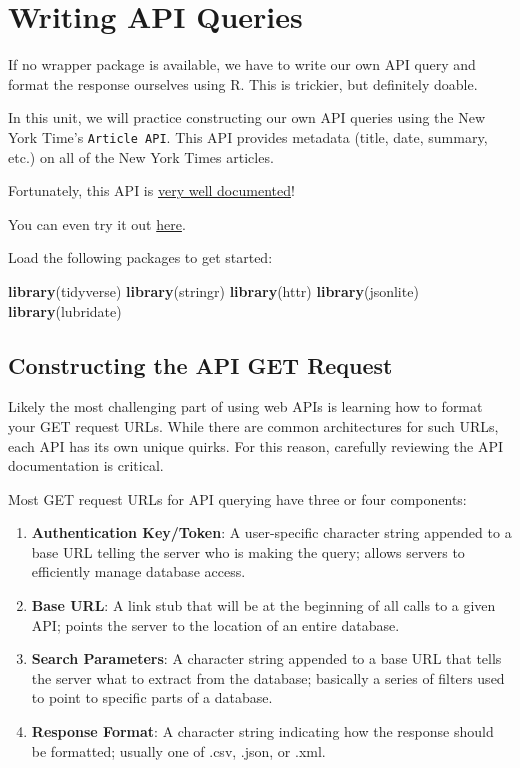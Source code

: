 \documentclass[
]{book}
\newenvironment{Shaded}{\begin{snugshade}}{\end{snugshade}}
\newcommand{\KeywordTok}[1]{\textcolor[rgb]{0.13,0.29,0.53}{\textbf{#1}}}
\newcommand{\NormalTok}[1]{#1}
\begin{document}
\hypertarget{writing-api-queries}{%
\section{Writing API Queries}\label{writing-api-queries}}

If no wrapper package is available, we have to write our own API query and format the response ourselves using R. This is trickier, but definitely doable.

In this unit, we will practice constructing our own API queries using the New York Time's \texttt{Article\ API}. This API provides metadata (title, date, summary, etc.) on all of the New York Times articles.

Fortunately, this API is \href{https://developer.nytimes.com/docs/articlesearch-product/1/overview}{very well documented}!

You can even try it out \href{http://developer.nytimes.com/io-docs}{here}.

Load the following packages to get started:

\begin{Shaded}
\begin{Highlighting}[]
\KeywordTok{library}\NormalTok{(tidyverse)}
\KeywordTok{library}\NormalTok{(stringr)}
\KeywordTok{library}\NormalTok{(httr)}
\KeywordTok{library}\NormalTok{(jsonlite)}
\KeywordTok{library}\NormalTok{(lubridate)}
\end{Highlighting}
\end{Shaded}

\hypertarget{constructing-the-api-get-request}{%
\subsection{Constructing the API GET Request}\label{constructing-the-api-get-request}}

Likely the most challenging part of using web APIs is learning how to format your GET request URLs. While there are common architectures for such URLs, each API has its own unique quirks. For this reason, carefully reviewing the API documentation is critical.

Most GET request URLs for API querying have three or four components:

\begin{enumerate}
\def\labelenumi{\arabic{enumi}.}
\item
  \textbf{Authentication Key/Token}: A user-specific character string appended to a base URL telling the server who is making the query; allows servers to efficiently manage database access.
\item
  \textbf{Base URL}: A link stub that will be at the beginning of all calls to a given API; points the server to the location of an entire database.
\item
  \textbf{Search Parameters}: A character string appended to a base URL that tells the server what to extract from the database; basically a series of filters used to point to specific parts of a database.
\item
  \textbf{Response Format}: A character string indicating how the response should be formatted; usually one of .csv, .json, or .xml.
\end{enumerate}
\end{document}
